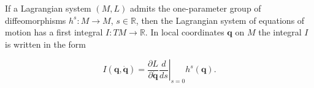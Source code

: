 If a Lagrangian system $(M, L)$ admits the one-parameter group of diffeomorphisms $h^s : M \to M$, $s \in \mathbb{R}$, then the Lagrangian system of equations of motion has a first integral $I : TM \to \mathbb{R}$. In local coordinates $\mathbf{q}$ on $M$ the integral $I$ is written in the form

$$I(\mathbf{q}, \dot{\mathbf{q}}) = \frac{\partial L}{\partial \dot{\mathbf{q}}} \left. \frac{d}{ds} \right|_{s=0} h^s(\mathbf{q}).$$
